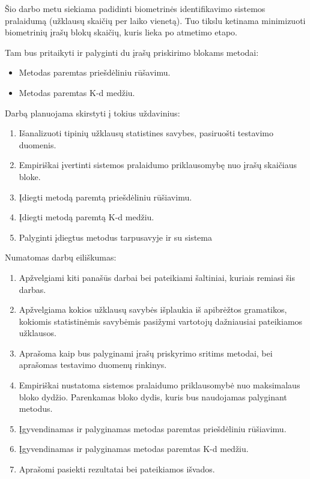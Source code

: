 Šio darbo metu siekiama padidinti biometrinės identifikavimo sistemos \cite{NeurotechnologyMegamatcherAccelerator} pralaidumą (užklausų skaičių per laiko vienetą).
Tuo tikslu ketinama minimizuoti biometrinių įrašų blokų skaičių, kuris lieka po atmetimo etapo.

Tam bus pritaikyti ir palyginti du įrašų priskirimo blokams metodai:
\begin{itemize}
		\item Metodas paremtas priešdėliniu rūšavimu.
		\item Metodas paremtas K-d medžiu.
\end{itemize}

Darbą planuojama skirstyti į tokius uždavinius:

\begin{enumerate}
	\item Išanalizuoti tipinių užklausų statistines savybes, pasiruošti testavimo duomenis.
	\item Empiriškai įvertinti sistemos pralaidumo priklausomybę nuo įrašų skaičiaus bloke.
	\item Įdiegti metodą paremtą priešdėliniu rūšiavimu.
	\item Įdiegti metodą paremtą K-d medžiu.
	\item Palyginti įdiegtus metodus tarpusavyje ir su sistema \cite{NeurotechnologyMegamatcherAccelerator}
\end{enumerate}

Numatomas darbų eiliškumas:
\begin{enumerate}
	\item Apžvelgiami kiti panašūs darbai bei pateikiami šaltiniai, kuriais remiasi šis darbas.
	\item Apžvelgiama kokios užklausų savybės išplaukia iš apibrėžtos gramatikos, kokiomis statistinėmis savybėmis pasižymi vartotojų dažniausiai pateikiamos užklausos.
	\item Aprašoma kaip bus palyginami įrašų priskyrimo sritims metodai, bei aprašomas testavimo duomenų rinkinys.
	\item Empiriškai nustatoma sistemos pralaidumo priklausomybė nuo maksimalaus bloko dydžio. Parenkamas bloko dydis, kuris bus naudojamas palyginant metodus.
	\item Įgyvendinamas ir palyginamas metodas paremtas priešdėliniu rūšiavimu.
	\item Įgyvendinamas ir palyginamas metodas paremtas K-d medžiu.
	\item Aprašomi pasiekti rezultatai bei pateikiamos išvados.
\end{enumerate}


